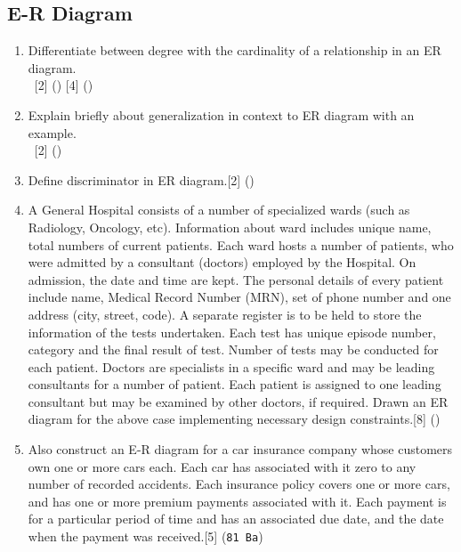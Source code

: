 \documentclass[12pt]{article}
\newcommand{\enter}{\\\textcolor{white}{1}}
\begin{document}
    \subsection{E-R Diagram}
    \begin{enumerate}
    \item Differentiate between degree with the cardinality of a relationship in an ER diagram.
    \enter\hfill[2] () [4] ()

    \item Explain briefly about generalization in context to ER diagram with an example.
    \enter\hfill[2] ()

    \item Define discriminator in ER diagram.\hfill[2] ()

    \item A General Hospital consists of a number of specialized wards (such as Radiology, Oncology, etc). Information about ward includes unique name, total numbers of current patients. Each ward hosts a number of patients, who were admitted by a consultant (doctors) employed by the Hospital. On admission, the date and time are kept. The personal details of every patient include name, Medical Record Number (MRN), set of phone number and one address (city, street, code). A separate register is to be held to store the information of the tests undertaken. Each test has unique episode number, category and the final result of test. Number of tests may be conducted for each patient. Doctors are specialists in a specific ward and may be leading consultants for a number of patient. Each patient is assigned to one leading consultant but may be examined by other doctors, if required. Drawn an ER diagram for the above case implementing necessary design constraints.\hfill[8] ()

    \item Also construct an E-R diagram for a car insurance company whose customers own one or more cars each. Each car has associated with it zero to any number of recorded accidents. Each insurance policy covers one or more cars, and has one or more premium payments associated with it. Each payment is for a particular period of time and has an associated due date, and the date when the payment was received.\hfill[5] (\texttt{81 Ba})


\end{enumerate}
\end{document}
